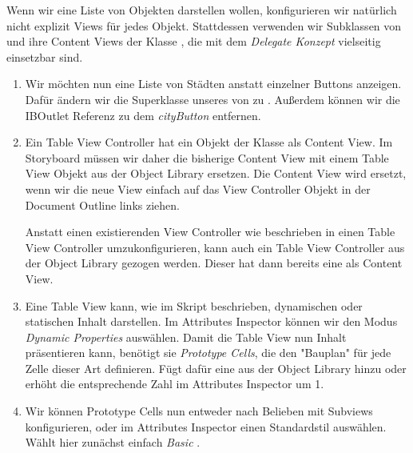\documentclass[parskip=half, final]{scrreprt}
\begin{document}
\begin{lecture}
Wenn wir eine Liste von Objekten darstellen wollen, konfigurieren wir natürlich nicht explizit Views für jedes Objekt. Stattdessen verwenden wir Subklassen von  und ihre Content Views der Klasse , die mit dem \emph{Delegate Konzept} vielseitig einsetzbar sind.


\begin{enumerate}

\item Wir möchten nun eine Liste von Städten anstatt einzelner Buttons anzeigen. Dafür ändern wir die Superklasse unseres  von  zu . Außerdem können wir die IBOutlet Referenz zu dem \emph{cityButton} entfernen.

\item Ein Table View Controller hat ein Objekt der  Klasse als Content View. Im Storyboard müssen wir daher die bisherige Content View mit einem Table View Objekt aus der Object Library ersetzen. Die Content View wird ersetzt, wenn wir die neue View einfach auf das View Controller Objekt in der Document Outline links ziehen.

 Anstatt einen existierenden View Controller wie beschrieben in einen Table View Controller umzukonfigurieren, kann auch ein Table View Controller aus der Object Library gezogen werden. Dieser hat dann bereits eine  als Content View.

\item Eine Table View kann, wie im Skript beschrieben, dynamischen oder statischen Inhalt darstellen. Im Attributes Inspector können wir den Modus \emph{Dynamic Properties} auswählen. Damit die Table View nun Inhalt präsentieren kann, benötigt sie \emph{Prototype Cells}, die den "{}Bauplan"{} für jede Zelle dieser Art definieren. Fügt dafür eine  aus der Object Library hinzu oder erhöht die entsprechende Zahl im Attributes Inspector um 1.

\item Wir können Prototype Cells nun entweder nach Belieben mit Subviews konfigurieren, oder im Attributes Inspector einen Standardstil auswählen. Wählt hier zunächst einfach \emph{Basic} .


\end{enumerate}
\end{lecture}
\end{document}

